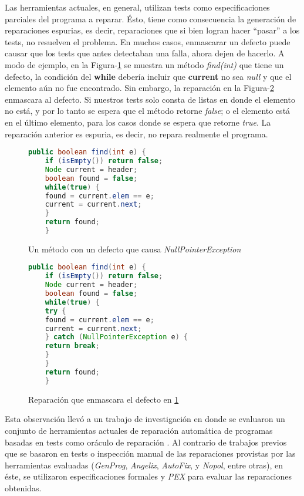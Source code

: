 Las herramientas actuales, en general, utilizan tests como especificaciones parciales del programa a reparar. \'Esto, tiene como consecuencia la generaci\'on de reparaciones espurias, es decir, reparaciones que si bien logran hacer ``pasar'' a los tests, no resuelven el problema. En muchos casos, enmascarar un defecto puede causar que los tests que antes detectaban una falla, ahora dejen de hacerlo. A modo de ejemplo, en la Figura-\ref{figures.examples.repair.nullaccessexample} se muestra un m\'etodo \emph{find(int)} que tiene un defecto, la condici\'on del \textbf{while} deber\'ia incluir que \textbf{current} no sea \emph{null} y que el elemento a\'un no fue encontrado. Sin embargo, la reparaci\'on en la Figura-\ref{figures.examples.repair.nullaccessexample.mask} enmascara al defecto. Si nuestros tests solo consta de listas en donde el elemento no est\'a, y por lo tanto se espera que el m\'etodo retorne \emph{false}; o el elemento est\'a en el \'ultimo elemento, para los casos donde se espera que retorne \emph{true}. La reparaci\'on anterior es espuria, es decir, no repara realmente el programa.

\begin{figure}
	\begin{lstlisting}[mathescape=true, language=Java]
	public boolean find(int e) {
	if (isEmpty()) return false;
	Node current = header;
	boolean found = false;
	while(true) {
	found = current.elem == e;
	current = current.next;
	}
	return found;
	}
	\end{lstlisting}
	\caption{Un m\'etodo con un defecto que causa \emph{NullPointerException}}
	\label{figures.examples.repair.nullaccessexample}
\end{figure}

\begin{figure}
	\begin{lstlisting}[mathescape=true, language=Java]
	public boolean find(int e) {
	if (isEmpty()) return false;
	Node current = header;
	boolean found = false;
	while(true) {
	try {
	found = current.elem == e;
	current = current.next;
	} catch (NullPointerException e) {
	return break;
	}
	}
	return found;
	}
	\end{lstlisting}
	\caption{Reparaci\'on que enmascara el defecto en \ref{figures.examples.repair.nullaccessexample}}
	\label{figures.examples.repair.nullaccessexample.mask}
\end{figure}

Esta observaci\'on llev\'o a un trabajo de investigaci\'on en donde se evaluaron un conjunto de herramientas actuales de reparaci\'on autom\'atica de programas basadas en tests como or\'aculo de reparaci\'on \cite{bibliography.repair.ZeminBGCDRAF17}. Al contrario de trabajos previos que se basaron en tests o inspecci\'on manual de las reparaciones provistas por las herramientas evaluadas (\emph{GenProg}, \emph{Angelix}, \emph{AutoFix}, y \emph{Nopol}, entre otras), en \'este, se utilizaron especificaciones formales y \emph{PEX} \cite{bibliography.formalver.TillmannH08} para evaluar las reparaciones obtenidas.


